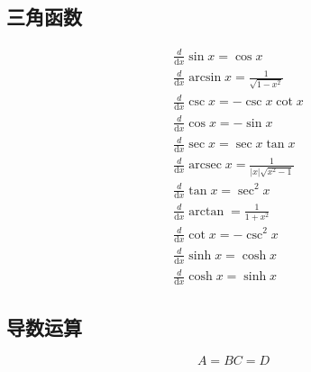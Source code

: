 \subsection{三角函数}
\begin{align}
&\frac{d}{\mathrm{d}{x}}\sin x = \cos x \label{derivative_sin}\\
&\frac{d}{\mathrm{d}{x}}\arcsin x = \frac{1}{\sqrt{1-x^2}} \label{derivative_arcsin}\\
&\frac{d}{\mathrm{d}{x}}\csc x = -\csc x\cot x \label{derivative_csc}\\
&\frac{d}{\mathrm{d}{x}}\cos x = -\sin x \label{derivative_cos}\\
&\frac{d}{\mathrm{d}{x}}\sec x = \sec x\tan x \label{derivative_sec}\\
&\frac{d}{\mathrm{d}{x}}\operatorname{arcsec}{x}=\frac{1}{\left|x\right|\sqrt{x^2-1}} \label{derivative_arcsec}\\
&\frac{d}{\mathrm{d}{x}}\tan x = \sec^2x \label{derivative_tan}\\
&\frac{d}{\mathrm{d}{x}}\arctan = \frac{1}{1+x^2} \label{derivative_arctan}\\
&\frac{d}{\mathrm{d}{x}}\cot x = -\csc^2x \label{derivative_cot}\\
&\frac{d}{\mathrm{d}{x}}\sinh x = \cosh x \label{derivative_sinh}\\
&\frac{d}{\mathrm{d}{x}}\cosh x = \sinh x \label{derivative_cosh}
\end{align}


\subsection{导数运算}

\newenvironment{mysubequations}
{ \begin{subequations}
  \renewcommand {\theequation}{\theparentequation-\arabic{equation}}}
{\end{subequations}}

\begin{mysubequations}
\begin{equation}
A = B
\end{equation}
\begin{equation}
C = D
\end{equation}
\end{mysubequations}
